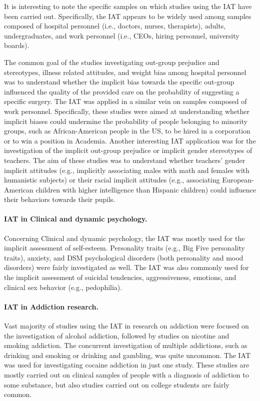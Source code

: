 \documentclass[12pt]{book}
\begin{document}
It is interesting to note the specific samples on which studies using the IAT have been carried out. Specifically, the IAT appears to be widely used among samples composed of hospital personnel (i.e., doctors, nurses, therapists), adults, undergraduates, and work personnel (i.e., CEOs, hiring personnel, university boards). 

The common goal of the studies investigating out-group prejudice and stereotypes, illness related attitudes, and weight bias among hospital personnel was to understand whether the implicit bias towards the specific out-group influenced the quality of the provided care on the probability of suggesting a specific surgery. The IAT was applied in a similar vein on samples composed of work personnel. Specifically, these studies were aimed at understanding whether implicit biases could undermine the probability of people belonging to minority groups, such as African-American people in the US, to be hired in a corporation or to win a position in Academia. Another interesting IAT application was for the investigation of the implicit out-group prejudice or implicit gender stereotypes of teachers. The aim of these studies was to understand whether teachers’ gender implicit attitudes (e.g., implicitly associating males with math and females with humanistic subjects) or their racial implicit attitudes (e.g., associating European-American children with higher intelligence than Hispanic children) could influence their behaviors towards their pupils.

\paragraph{IAT in Clinical and dynamic psychology.} Concerning Clinical and dynamic psychology, the IAT was mostly used for the implicit assessment of self-esteem. Personality traits (e.g., Big Five personality traits), anxiety, and DSM psychological disorders (both personality and mood disorders) were fairly investigated as well. The IAT was also commonly used for the implicit assessment of suicidal tendencies, aggressiveness, emotions, and clinical sex behavior (e.g., pedophilia). 

\paragraph{IAT in Addiction research.} Vast majority of studies using the IAT in research on addiction were focused on the investigation of alcohol addiction, followed by studies on nicotine and smoking addiction. The concurrent investigation of multiple addictions, such as drinking and smoking or drinking and gambling, was quite uncommon. The IAT was used for investigating cocaine addiction in just one study. 
These studies are mostly carried out on clinical samples of people with a diagnosis of addiction to some substance, but also studies carried out on college students are fairly common. 
\end{document}
